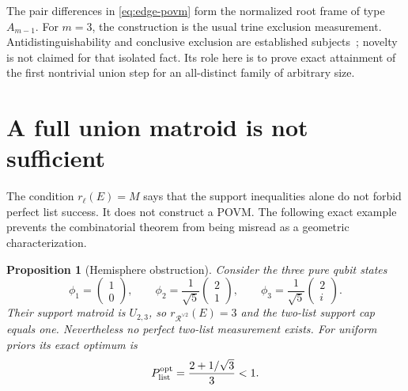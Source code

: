 \documentclass[11pt]{article}
\newtheorem{proposition}[theorem]{Proposition}
\theoremstyle{definition}
\theoremstyle{remark}
\newcommand{\cR}{\mathcal R}
\begin{document}
The pair differences in \eqref{eq:edge-povm} form the normalized root frame of
type $A_{m-1}$.  For $m=3$, the construction is the usual trine exclusion
measurement.  Antidistinguishability and conclusive exclusion are established
subjects~\cite{bandyopadhyay2014}; novelty is not claimed for that isolated
fact.  Its role here is to prove exact attainment of the first nontrivial
union step for an all-distinct family of arbitrary size.

\section{A full union matroid is not sufficient}\label{sec:counterexample}

The condition $r_\ell(E)=M$ says that the support inequalities alone do not
forbid perfect list success.  It does not construct a POVM.  The following
exact example prevents the combinatorial theorem from being misread as a
geometric characterization.

\begin{proposition}[Hemisphere obstruction]\label{prop:counterexample}
Consider the three pure qubit states
\begin{equation}\label{eq:counter-states}
 \phi_1=\begin{pmatrix}1\\0\end{pmatrix},\qquad
 \phi_2=\frac1{\sqrt5}\begin{pmatrix}2\\1\end{pmatrix},\qquad
 \phi_3=\frac1{\sqrt5}\begin{pmatrix}2\\i\end{pmatrix}.
\end{equation}
Their support matroid is $U_{2,3}$, so
$r_{\cR^{\vee2}}(E)=3$ and the two-list support cap equals one.  Nevertheless
no perfect two-list measurement exists.  For uniform priors its exact optimum
is
\begin{equation}\label{eq:counter-opt}
 P_{\rm list}^{\rm opt}=\frac{2+1/\sqrt3}{3}<1.
\end{equation}
\end{proposition}
\end{document}
